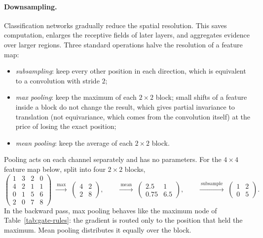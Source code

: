 \paragraph{Downsampling.}
Classification networks gradually reduce the spatial resolution. This saves
computation, enlarges the receptive fields of later layers, and aggregates
evidence over larger regions. Three standard operations halve the resolution
of a feature map:
\begin{itemize}
  \item \emph{subsampling}: keep every other position in each direction, which
        is equivalent to a convolution with stride $2$;
  \item \emph{max pooling}: keep the maximum of each $2\times2$ block; small
        shifts of a feature inside a block do not change the result, which gives
        partial invariance to translation (not equivariance, which comes from
        the convolution itself) at the price of losing the exact position;
  \item \emph{mean pooling}: keep the average of each $2\times2$ block.
\end{itemize}
\noindent
Pooling acts on each channel separately and has no parameters. For the
$4\times4$ feature map below, split into four $2\times2$ blocks,
\begin{equation*}
  \begin{pmatrix}
    1 & 3 & 2 & 0\\ 4 & 2 & 1 & 1\\ 0 & 1 & 5 & 6\\ 2 & 0 & 7 & 8
  \end{pmatrix}
  \;\xrightarrow{\ \text{max}\ }\;
  \begin{pmatrix} 4 & 2\\ 2 & 8 \end{pmatrix},
  \qquad
  \xrightarrow{\ \text{mean}\ }\;
  \begin{pmatrix} 2.5 & 1\\ 0.75 & 6.5 \end{pmatrix},
  \qquad
  \xrightarrow{\ \text{subsample}\ }\;
  \begin{pmatrix} 1 & 2\\ 0 & 5 \end{pmatrix}.
\end{equation*}
\noindent
In the backward pass, max pooling behaves like the maximum node of
Table~\ref{tab:gate-rules}: the gradient is routed only to the position that
held the maximum. Mean pooling distributes it equally over the block.

